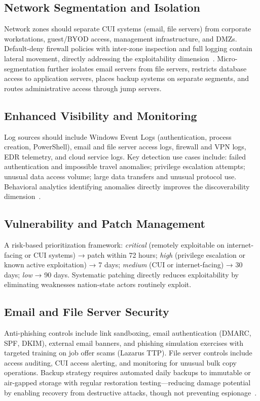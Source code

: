 \documentclass[sigconf,nonacm]{acmart}
\begin{document}
\subsection{Network Segmentation and Isolation}

Network zones should separate CUI systems (email, file servers) from corporate
workstations, guest/BYOD access, management infrastructure, and DMZs. Default-deny
firewall policies with inter-zone inspection and full logging contain lateral movement,
directly addressing the exploitability dimension~\cite{rockwell2024}. Micro-segmentation
further isolates email servers from file servers, restricts database access to
application servers, places backup systems on separate segments, and routes
administrative access through jump servers.

\subsection{Enhanced Visibility and Monitoring}

Log sources should include Windows Event Logs (authentication, process creation,
PowerShell), email and file server access logs, firewall and VPN logs, EDR telemetry,
and cloud service logs. Key detection use cases include: failed authentication and
impossible travel anomalies; privilege escalation attempts; unusual data access volume;
large data transfers and unusual protocol use. Behavioral analytics identifying anomalies
directly improves the discoverability dimension~\cite{guidehouse2023}.

\subsection{Vulnerability and Patch Management}

A risk-based prioritization framework: \emph{critical} (remotely exploitable on
internet-facing or CUI systems) → patch within 72 hours; \emph{high} (privilege
escalation or known active exploitation) → 7 days; \emph{medium} (CUI or
internet-facing) → 30 days; \emph{low} → 90 days. Systematic patching directly reduces
exploitability by eliminating weaknesses nation-state actors routinely exploit.

\subsection{Email and File Server Security}

Anti-phishing controls include link sandboxing, email authentication
(DMARC, SPF, DKIM), external email banners, and phishing simulation exercises with
targeted training on job offer scams (Lazarus TTP). File server controls include access auditing, CUI access alerting, and monitoring
for unusual bulk copy operations. Backup strategy requires automated daily backups to
immutable or air-gapped storage with regular restoration testing---reducing damage
potential by enabling recovery from destructive attacks, though not preventing
espionage~\cite{networkcomputing2024}.
\end{document}
